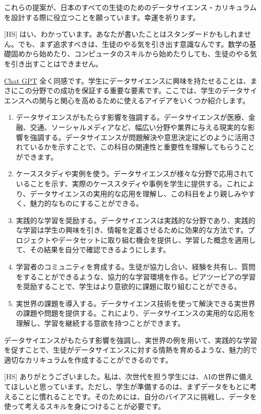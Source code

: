 \documentclass[
]{bxjsbook}
\theoremstyle{definition}
\theoremstyle{definition}
\theoremstyle{definition}
\theoremstyle{definition}
\theoremstyle{remark}
\begin{document}
これらの提案が、日本のすべての生徒のためのデータサイエンス・カリキュラムを設計する際に役立つことを願っています。幸運を祈ります。

{[}HS{]} はい、わかっています。あなたが書いたことはスタンダードかもしれません。でも、まず追求すべきは、生徒のやる気を引き出す意識なんです。数学の基礎固めから始めたり、コンピュータのスキルから始めたりしても、生徒のやる気を引き出すことはできません。

\protect\hyperlink{chatgpt}{Chat GPT} 全く同感です。学生にデータサイエンスに興味を持たせることは、まさにこの分野での成功を保証する重要な要素です。ここでは、学生のデータサイエンスへの関与と関心を高めるために使えるアイデアをいくつか紹介します。

\begin{enumerate}
\def\labelenumi{\arabic{enumi}.}
\item
  データサイエンスがもたらす影響を強調する。データサイエンスが医療、金融、交通、ソーシャルメディアなど、幅広い分野や業界に与える現実的な影響を強調する。データサイエンスが問題解決や意思決定にどのように活用されているかを示すことで、この科目の関連性と重要性を理解してもらうことができます。
\item
  ケーススタディや実例を使う。データサイエンスが様々な分野で応用されていることを示す、実際のケーススタディや事例を学生に提供する。これにより、データサイエンスの実用的な応用を理解し、この科目をより親しみやすく、魅力的なものにすることができる。
\item
  実践的な学習を奨励する。データサイエンスは実践的な分野であり、実践的な学習は学生の興味を引き、情報を定着させるために効果的な方法です。プロジェクトやデータセットに取り組む機会を提供し、学習した概念を適用して、その結果を自分で確認できるようにします。
\item
  学習者のコミュニティを育成する。生徒が協力し合い、経験を共有し、質問をすることができるような、協力的な学習環境を作る。ピアツーピアの学習を奨励することで、学生はより意欲的に課題に取り組むことができる。
\item
  実世界の課題を導入する。データサイエンス技術を使って解決できる実世界の課題や問題を提供する。これにより、データサイエンスの実用的な応用を理解し、学習を継続する意欲を持つことができます。
\end{enumerate}

データサイエンスがもたらす影響を強調し、実世界の例を用いて、実践的な学習を促すことで、生徒がデータサイエンスに対する情熱を育めるような、魅力的で適切なカリキュラムを作成することができるのです。

{[}HS{]} ありがとうございました。私は、次世代を担う学生には、AIの世界に備えてほしいと思っています。ただし、学生が準備するのは、まずデータをもとに考えることに慣れることです。そのためには、自分のバイアスに挑戦し、データを使って考えるスキルを身につけることが必要です。
\end{document}
